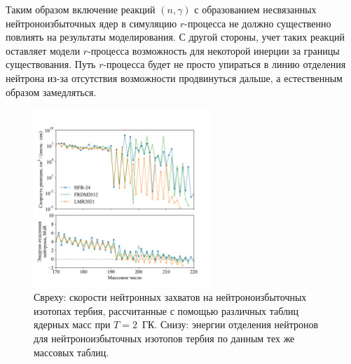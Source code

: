 Таким образом включение реакций $(n,\gamma)$ с образованием несвязанных нейтроноизбыточных ядер в симуляцию $r$-процесса не должно существенно повлиять на результаты моделирования. С другой стороны, учет таких реакций оставляет модели $r$-процесса возможность для некоторой инерции за границы существования. Путь $r$-процесса будет не просто упираться в линию отделения нейтрона из-за отсутствия возможности продвинуться дальше, а естественным образом замедляться.  

\begin{figure}
  \centering
  \includegraphics[width=0.6\textwidth]{pics/rates_vs_A_tb.pdf}
  \caption{Свреху: скорости нейтронных захватов на нейтроноизбыточных изотопах тербия, рассчитанные с помощью различных таблиц ядерных масс при $T = 2$~ГК. Снизу: энергии отделения нейтронов для нейтроноизбыточных изотопов тербия по данным тех же массовых таблиц.}
  \label{fig:rates_vs_A}
\end{figure}

